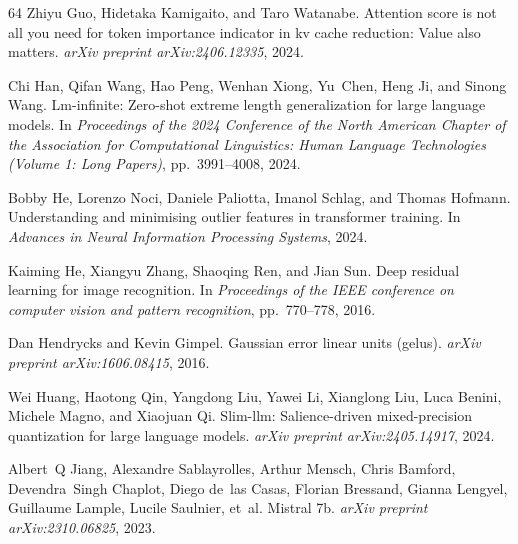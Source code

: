 \documentclass{article} \usepackage{iclr2025_conference,times}
\begin{document}
\begin{thebibliography}{64}
Zhiyu Guo, Hidetaka Kamigaito, and Taro Watanabe.
\newblock Attention score is not all you need for token importance indicator in kv cache reduction: Value also matters.
\newblock \emph{arXiv preprint arXiv:2406.12335}, 2024{}.

Chi Han, Qifan Wang, Hao Peng, Wenhan Xiong, Yu~Chen, Heng Ji, and Sinong Wang.
\newblock Lm-infinite: Zero-shot extreme length generalization for large language models.
\newblock In \emph{Proceedings of the 2024 Conference of the North American Chapter of the Association for Computational Linguistics: Human Language Technologies (Volume 1: Long Papers)}, pp.\  3991--4008, 2024.

Bobby He, Lorenzo Noci, Daniele Paliotta, Imanol Schlag, and Thomas Hofmann.
\newblock Understanding and minimising outlier features in transformer training.
\newblock In \emph{Advances in Neural Information Processing Systems}, 2024.

Kaiming He, Xiangyu Zhang, Shaoqing Ren, and Jian Sun.
\newblock Deep residual learning for image recognition.
\newblock In \emph{Proceedings of the IEEE conference on computer vision and pattern recognition}, pp.\  770--778, 2016.

Dan Hendrycks and Kevin Gimpel.
\newblock Gaussian error linear units (gelus).
\newblock \emph{arXiv preprint arXiv:1606.08415}, 2016.

Wei Huang, Haotong Qin, Yangdong Liu, Yawei Li, Xianglong Liu, Luca Benini, Michele Magno, and Xiaojuan Qi.
\newblock Slim-llm: Salience-driven mixed-precision quantization for large language models.
\newblock \emph{arXiv preprint arXiv:2405.14917}, 2024.

Albert~Q Jiang, Alexandre Sablayrolles, Arthur Mensch, Chris Bamford, Devendra~Singh Chaplot, Diego de~las Casas, Florian Bressand, Gianna Lengyel, Guillaume Lample, Lucile Saulnier, et~al.
\newblock Mistral 7b.
\newblock \emph{arXiv preprint arXiv:2310.06825}, 2023.


\end{thebibliography}
\end{document}
